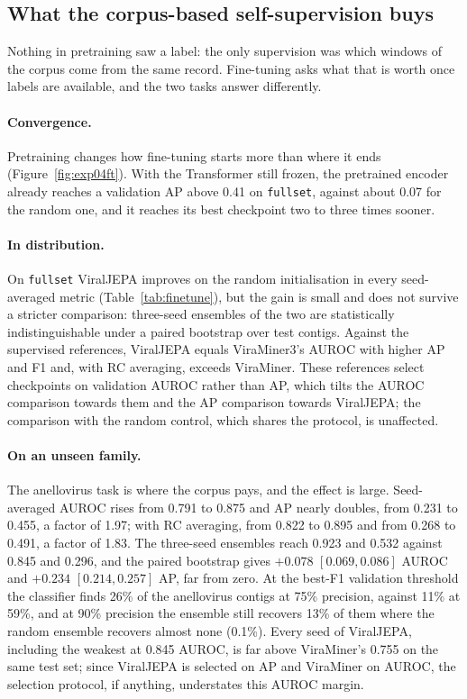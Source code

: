 \documentclass[10pt,twocolumn,a4paper]{article}
\begin{document}
\subsection{What the corpus-based self-supervision buys}\label{sec:res:ft}

Nothing in pretraining saw a label: the only supervision was which windows of
the corpus come from the same record. Fine-tuning asks what that is worth once
labels are available, and the two tasks answer differently.

\paragraph{Convergence.}
Pretraining changes how fine-tuning starts more than where it ends
(Figure~\ref{fig:exp04ft}). With the Transformer still frozen, the pretrained
encoder already reaches a validation AP above 0.41 on \texttt{fullset}, against
about 0.07 for the random one, and it reaches its best checkpoint two to three
times sooner.

\paragraph{In distribution.}
On \texttt{fullset} ViralJEPA improves on the random initialisation in every
seed-averaged metric (Table~\ref{tab:finetune}), but the gain is small and does
not survive a stricter comparison: three-seed ensembles of the two are
statistically indistinguishable under a paired bootstrap over test contigs.
Against the supervised references, ViralJEPA equals ViraMiner3's AUROC with
higher AP and F1 and, with RC averaging, exceeds ViraMiner. These references
select checkpoints on validation AUROC rather than AP, which tilts the AUROC
comparison towards them and the AP comparison towards ViralJEPA; the comparison
with the random control, which shares the protocol, is unaffected.

\paragraph{On an unseen family.}
The anellovirus task is where the corpus pays, and the effect is large.
Seed-averaged AUROC rises from 0.791 to 0.875 and AP nearly doubles, from 0.231
to 0.455, a factor of 1.97; with RC averaging, from 0.822 to 0.895 and from 0.268
to 0.491, a factor of 1.83. The three-seed ensembles reach 0.923 and 0.532 against 0.845 and 0.296, and the
paired bootstrap gives $+0.078$ $[0.069, 0.086]$ AUROC and $+0.234$
$[0.214, 0.257]$ AP, far from zero. At the best-F1 validation threshold the
classifier finds 26\% of the anellovirus contigs at 75\% precision, against 11\%
at 59\%, and at 90\% precision the ensemble still recovers 13\% of them where the
random ensemble recovers almost none (0.1\%). Every seed of ViralJEPA, including the weakest at
0.845 AUROC, is far above ViraMiner's 0.755 on the same test set; since
ViralJEPA is selected on AP and ViraMiner on AUROC, the selection protocol, if
anything, understates this AUROC margin.
\end{document}
